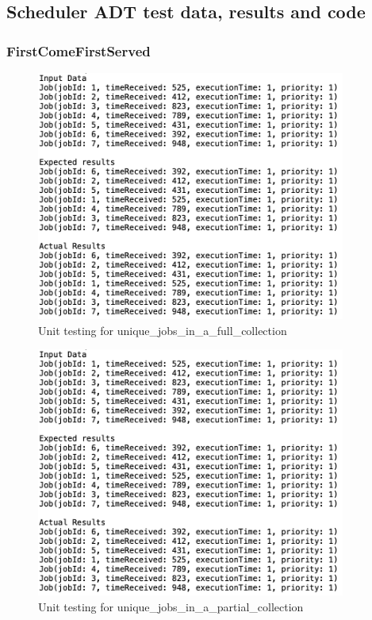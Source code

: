 \documentclass[a4paper]{article}
\begin{document}
\subsection{Scheduler ADT test data, results and code}

\subsubsection{FirstComeFirstServed}
\begin{figure}[H]
   \includegraphics[height=8.2cm]{images/FCFS-unique_jobs_in_a_full_collection.png}
   \caption{Unit testing for unique\_jobs\_in\_a\_full\_collection}
\end{figure}

\begin{figure}[H]
   \includegraphics[height=8.2cm]{images/FCFS-unique_jobs_in_a_full_collection.png}
   \caption{Unit testing for unique\_jobs\_in\_a\_partial\_collection}
\end{figure}
\end{document}
